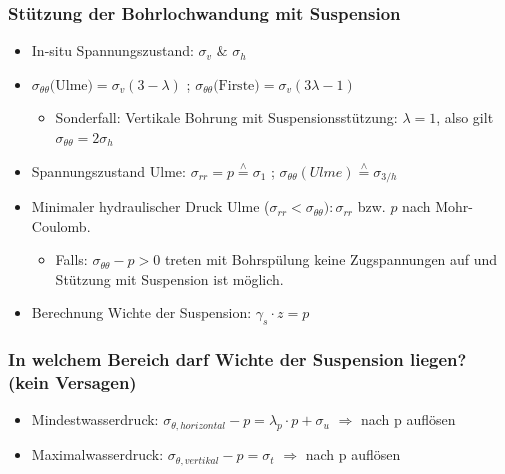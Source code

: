 \documentclass[fleqn,twoside]{article}
\begin{document}
\subsubsection{Stützung der Bohrlochwandung mit Suspension}
\begin{itemize}
    \item In-situ Spannungszustand: $\sigma_v$ $\&$ $\sigma_h$
    \item $\sigma_{\theta\theta}\text{(Ulme)} = \sigma_v(3-\lambda)$ ; $\sigma_{\theta\theta}\text{(Firste)} = \sigma_v(3\lambda-1)$
        \begin{itemize}
            \item Sonderfall: Vertikale Bohrung mit Suspensionsstützung: $\lambda=1$, also gilt $\sigma_{\theta\theta}=2\sigma_h$
        \end{itemize} 
    \item Spannungszustand Ulme: $\sigma_{rr}=p \overset{\wedge}{=}  \sigma_1$ ; $\sigma_{\theta\theta}(Ulme) \overset{\wedge}{=} \sigma_{3/h}$
    \item Minimaler hydraulischer Druck Ulme ($\sigma_{rr} < \sigma_{\theta\theta}): \sigma_{rr}$ bzw. $p$ nach Mohr-Coulomb.
        \begin{itemize}
            \item Falls: $\sigma_{\theta\theta}-p>0$ treten mit Bohrspülung keine Zugspannungen auf und Stützung mit Suspension ist möglich.
        \end{itemize}
    \item Berechnung Wichte der Suspension: $\gamma_s \cdot z = p$
\end{itemize}

\subsubsection{In welchem Bereich darf Wichte der Suspension liegen? (kein Versagen)}
\begin{itemize}
    \item Mindestwasserdruck: $\sigma_{\theta,horizontal}-p=\lambda_p \cdot p +\sigma_u$ $\Rightarrow$ nach p auflösen
    \item Maximalwasserdruck: $\sigma_{\theta,vertikal}-p=\sigma_t$ $\Rightarrow$ nach p auflösen
\end{itemize}
\end{document}
